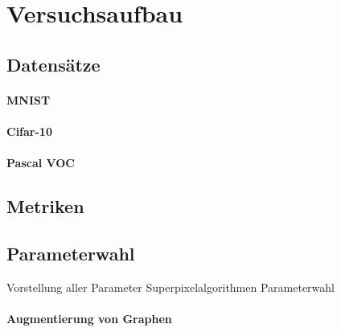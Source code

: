 \section{Versuchsaufbau}
\label{versuchsaufbau}

\subsection{Datensätze}
\label{datensaetze}

\paragraph{MNIST}
\label{MNIST}

\cite{mnist}

\paragraph{Cifar-10}
\label{cifar_10}

\cite{cifar_10}

\paragraph{Pascal VOC}
\label{pascal_voc}

\cite{pascal_voc}

\subsection{Metriken}
\label{metriken}

\subsection{Parameterwahl}
\label{parameterwahl}

Vorstellung aller Parameter
Superpixelalgorithmen Parameterwahl

\paragraph{Augmentierung von Graphen}
\label{augmentierung_von_graphen}
